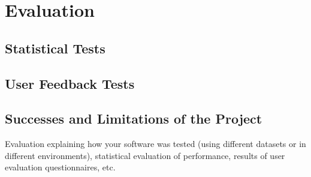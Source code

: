 \section{Evaluation}
\subsection{Statistical Tests}
\subsection{User Feedback Tests}
\subsection{Successes and Limitations of the Project}

{\color{red} Evaluation explaining how your software was tested (using different datasets or in different environments), statistical evaluation of performance, results of user evaluation questionnaires, etc. }